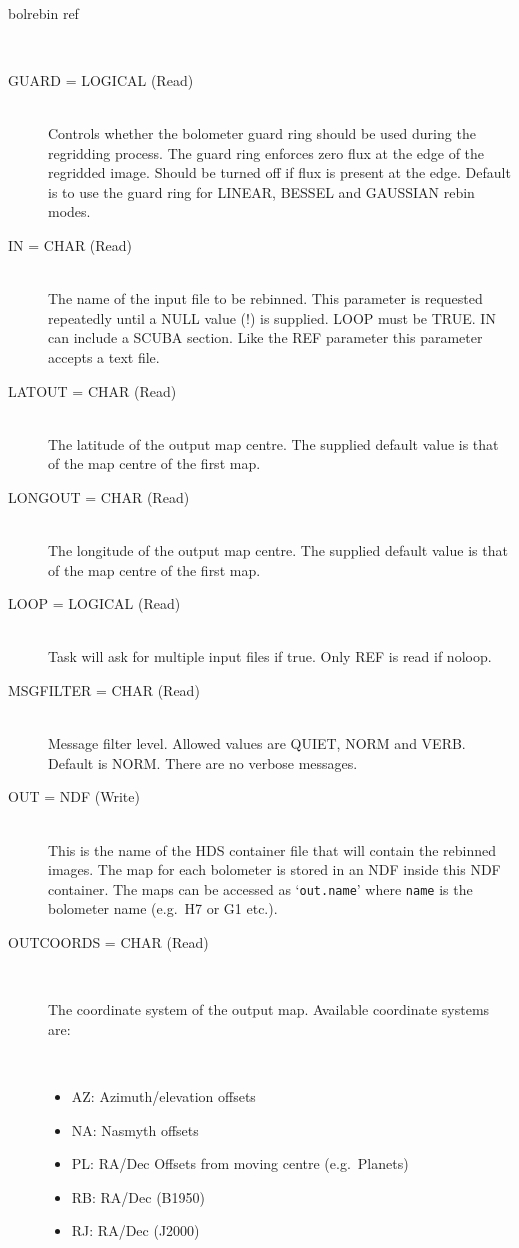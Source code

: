\documentclass[twoside,11pt]{article}
\newcommand{\htmlref}[2]{#1}
\renewcommand{\_}{\texttt{\symbol{95}}}
\newcommand{\sstusage}[1]{\item[Usage:] \mbox{}
\\[1.3ex]{\raggedright \ssttt #1}}
\newcommand{\sstparameters}[1]{
   \item[Parameters:] \mbox{} \\
   \vspace{-3.5ex}
   \begin{description}
      #1
   \end{description}
}
\newcommand{\sstsubsection}[1]{ \item[{#1}] \mbox{} \\}
\newcommand{\sstitemlist}[1]{
  \mbox{} \\
  \vspace{-3.5ex}
  \begin{itemize}
     #1
  \end{itemize}
}
\newcommand{\sstitem}{\item}
\newcommand{\sstusage}[1]{\item[Usage:]
      \begin{description}
         {\ssttt #1}
      \end{description}
      \\
   }
\newcommand{\sstparameters}[1]{
      \item[Parameters:] \\
      \begin{description}
         #1
      \end{description}
      \\
   }
\newcommand{\sstsubsection}[1]{\item[{#1}]}
\newcommand{\sstitemlist}[1]{
      \begin{itemize}
         #1
      \end{itemize}
      \\
   }
\newcommand{\sstitem}{\item}
\begin{document}
{{{      }
   }
   \sstusage{
      bolrebin ref
   }
   \sstparameters{
      \sstsubsection{
         GUARD = LOGICAL (Read)
      }{
            Controls whether the bolometer guard ring should be used during
   the regridding process. The guard ring enforces zero flux at the
   edge of the regridded image. Should be turned off if flux is present
   at the edge. Default is to use the guard ring for LINEAR, BESSEL
   and GAUSSIAN rebin modes.
      }
      \sstsubsection{
         IN = CHAR (Read)
      }{
         The name of the input file to be rebinned. This parameter is requested
         repeatedly until a NULL value (!) is supplied. LOOP must be TRUE.
         IN can include a \htmlref{SCUBA section}{sections}.
         Like the REF parameter this parameter accepts a text file.
      }
      \sstsubsection{
         LAT\_OUT = CHAR (Read)
      }{
         The latitude of the output map centre. The supplied default value
         is that of the map centre of the first map.
      }
      \sstsubsection{
         LONG\_OUT = CHAR (Read)
      }{
         The longitude of the output map centre. The supplied default value
         is that of the map centre of the first map.
      }
      \sstsubsection{
         LOOP = LOGICAL (Read)
      }{
         Task will ask for multiple input files if true. Only REF is read
         if noloop.
      }
      \sstsubsection{
         MSG\_FILTER = CHAR (Read)
      }{
         Message filter level. Allowed values are QUIET, NORM and VERB. 
         Default is NORM. There are no verbose messages.
      }
      \sstsubsection{
         OUT = NDF (Write)
      }{
        This is the name of the HDS container file that will contain the
        rebinned images. The map for each bolometer is stored in an NDF
        inside this NDF container. The maps can be accessed as 
        `\texttt{out.name}' where \texttt{name} is the bolometer name (e.g.\
        H7 or G1 etc.).
      }
      \sstsubsection{
         OUT\_COORDS = CHAR (Read)
      }{
         The coordinate system of the output map. Available coordinate
         systems are:
         \sstitemlist{

            \sstitem
            AZ:  Azimuth/elevation offsets

            \sstitem
            NA:  Nasmyth offsets

            \sstitem
            PL:  RA/Dec Offsets from moving centre (e.g.\ Planets)

            \sstitem
            RB:  RA/Dec (B1950)

            \sstitem
            RJ:  RA/Dec (J2000)

}}}}
\end{document}
